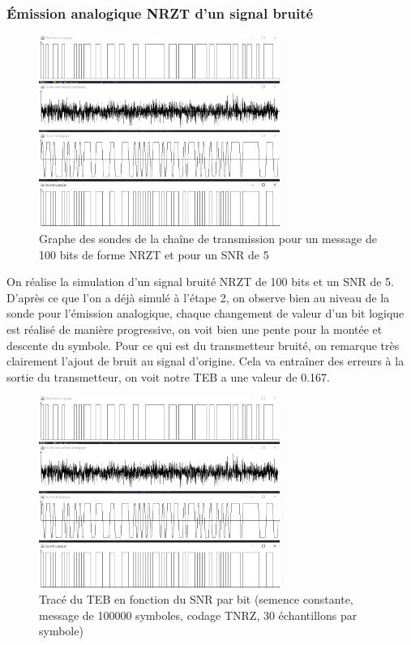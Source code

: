 \subsubsection{Émission analogique NRZT d'un signal bruité}
\begin{figure}[H]
    \centering
    \includegraphics[width=0.7\textwidth]{img/etape3_emission_NRZT_bruite.png}
    \caption{Graphe des sondes de la chaîne de transmission pour un message de 100 bits de forme NRZT et pour un SNR de 5}
    \label{fig:etape_3_NRZT_bruite}
\end{figure}

On réalise la simulation d'un signal bruité NRZT de 100 bits et un SNR de 5. D'après ce que l'on a déjà simulé à l'étape 2, on observe bien au niveau de la sonde pour l'émission analogique, chaque changement de valeur d'un bit logique est réalisé de manière progressive, on voit bien une pente pour la montée et descente du symbole. Pour ce qui est du transmetteur bruité, on remarque très clairement l'ajout de bruit au signal d'origine. Cela va entraîner des erreurs à la sortie du transmetteur, on voit notre TEB a une valeur de 0.167.

\begin{figure}[H]
    \centering
    \includegraphics[width=0.7\textwidth]{img/etape3_emission_NRZT_bruite.png}
    \caption{Tracé du TEB en fonction du SNR par bit (semence constante, message de 100000 symboles, codage TNRZ, 30 échantillons par symbole)}
    \label{fig:etape_3_NRZT_bruite}
\end{figure}

